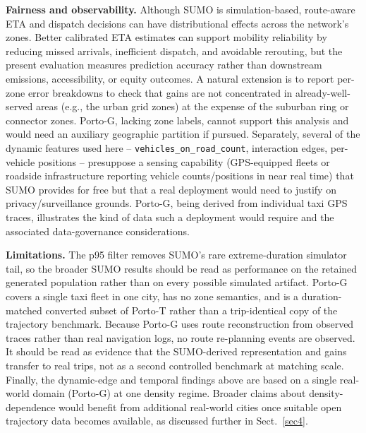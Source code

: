\textbf{Fairness and observability.} Although SUMO is simulation-based, route-aware ETA and dispatch decisions can have distributional effects across the network's zones. Better calibrated ETA estimates can support mobility reliability by reducing missed arrivals, inefficient dispatch, and avoidable rerouting, but the present evaluation measures prediction accuracy rather than downstream emissions, accessibility, or equity outcomes. A natural extension is to report per-zone error breakdowns to check that gains are not concentrated in already-well-served areas (e.g., the urban grid zones) at the expense of the suburban ring or connector zones. Porto-G, lacking zone labels, cannot support this analysis and would need an auxiliary geographic partition if pursued. Separately, several of the dynamic features used here -- \texttt{vehicles\_on\_road\_count}, interaction edges, per-vehicle positions -- presuppose a sensing capability (GPS-equipped fleets or roadside infrastructure reporting vehicle counts/positions in near real time) that SUMO provides for free but that a real deployment would need to justify on privacy/surveillance grounds. Porto-G, being derived from individual taxi GPS traces, illustrates the kind of data such a deployment would require and the associated data-governance considerations.

\textbf{Limitations.} The p95 filter removes SUMO's rare extreme-duration simulator tail, so the broader SUMO results should be read as performance on the retained generated population rather than on every possible simulated artifact. Porto-G covers a single taxi fleet in one city, has no zone semantics, and is a duration-matched converted subset of Porto-T rather than a trip-identical copy of the trajectory benchmark. Because Porto-G uses route reconstruction from observed traces rather than real navigation logs, no route re-planning events are observed. It should be read as evidence that the SUMO-derived representation and gains transfer to real trips, not as a second controlled benchmark at matching scale. Finally, the dynamic-edge and temporal findings above are based on a single real-world domain (Porto-G) at one density regime. Broader claims about density-dependence would benefit from additional real-world cities once suitable open trajectory data becomes available, as discussed further in Sect.~\ref{sec4}.
